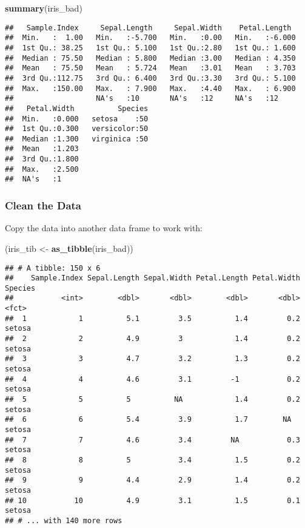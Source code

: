 \documentclass[
]{article}
\newenvironment{Shaded}{\begin{snugshade}}{\end{snugshade}}
\newcommand{\KeywordTok}[1]{\textcolor[rgb]{0.13,0.29,0.53}{\textbf{#1}}}
\newcommand{\NormalTok}[1]{#1}
\newcommand{\StringTok}[1]{\textcolor[rgb]{0.31,0.60,0.02}{#1}}
\begin{document}
\begin{Shaded}
\begin{Highlighting}[]
\KeywordTok{summary}\NormalTok{(iris\_bad)}
\end{Highlighting}
\end{Shaded}

\begin{verbatim}
##   Sample.Index     Sepal.Length     Sepal.Width    Petal.Length   
##  Min.   :  1.00   Min.   :-5.700   Min.   :0.00   Min.   :-6.000  
##  1st Qu.: 38.25   1st Qu.: 5.100   1st Qu.:2.80   1st Qu.: 1.600  
##  Median : 75.50   Median : 5.800   Median :3.00   Median : 4.350  
##  Mean   : 75.50   Mean   : 5.724   Mean   :3.01   Mean   : 3.703  
##  3rd Qu.:112.75   3rd Qu.: 6.400   3rd Qu.:3.30   3rd Qu.: 5.100  
##  Max.   :150.00   Max.   : 7.900   Max.   :4.40   Max.   : 6.900  
##                   NA's   :10       NA's   :12     NA's   :12      
##   Petal.Width          Species  
##  Min.   :0.000   setosa    :50  
##  1st Qu.:0.300   versicolor:50  
##  Median :1.300   virginica :50  
##  Mean   :1.203                  
##  3rd Qu.:1.800                  
##  Max.   :2.500                  
##  NA's   :1
\end{verbatim}

\hypertarget{clean-the-data}{%
\subsubsection{Clean the Data}\label{clean-the-data}}

Copy the data into another data frame to work with:

\begin{Shaded}
\begin{Highlighting}[]
\NormalTok{(iris\_tib <{-}}\StringTok{ }\KeywordTok{as\_tibble}\NormalTok{(iris\_bad))}
\end{Highlighting}
\end{Shaded}

\begin{verbatim}
## # A tibble: 150 x 6
##    Sample.Index Sepal.Length Sepal.Width Petal.Length Petal.Width Species
##           <int>        <dbl>       <dbl>        <dbl>       <dbl> <fct>  
##  1            1          5.1         3.5          1.4         0.2 setosa 
##  2            2          4.9         3            1.4         0.2 setosa 
##  3            3          4.7         3.2          1.3         0.2 setosa 
##  4            4          4.6         3.1         -1           0.2 setosa 
##  5            5          5          NA            1.4         0.2 setosa 
##  6            6          5.4         3.9          1.7        NA   setosa 
##  7            7          4.6         3.4         NA           0.3 setosa 
##  8            8          5           3.4          1.5         0.2 setosa 
##  9            9          4.4         2.9          1.4         0.2 setosa 
## 10           10          4.9         3.1          1.5         0.1 setosa 
## # ... with 140 more rows
\end{verbatim}
\end{document}
